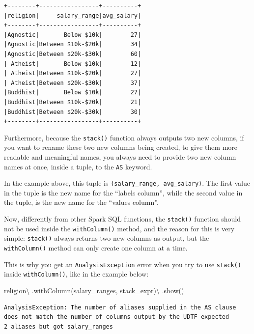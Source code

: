 \documentclass[
  11pt,
  letterpaper,
  DIV=11,
  numbers=noendperiod]{scrreprt}
\newenvironment{Shaded}{\begin{snugshade}}{\end{snugshade}}
\newcommand{\NormalTok}[1]{\textcolor[rgb]{0.00,0.23,0.31}{#1}}
\newcommand{\OperatorTok}[1]{\textcolor[rgb]{0.37,0.37,0.37}{#1}}
\newcommand{\StringTok}[1]{\textcolor[rgb]{0.13,0.47,0.30}{#1}}
\begin{document}
\begin{verbatim}
+--------+-----------------+----------+
|religion|     salary_range|avg_salary|
+--------+-----------------+----------+
|Agnostic|       Below $10k|        27|
|Agnostic|Between $10k-$20k|        34|
|Agnostic|Between $20k-$30k|        60|
| Atheist|       Below $10k|        12|
| Atheist|Between $10k-$20k|        27|
| Atheist|Between $20k-$30k|        37|
|Buddhist|       Below $10k|        27|
|Buddhist|Between $10k-$20k|        21|
|Buddhist|Between $20k-$30k|        30|
+--------+-----------------+----------+
\end{verbatim}

Furthermore, because the \texttt{stack()} function always outputs two
new columns, if you want to rename these two new columns being created,
to give them more readable and meaningful names, you always need to
provide two new column names at once, inside a tuple, to the \texttt{AS}
keyword.

In the example above, this tuple is
\texttt{(salary\_range,\ avg\_salary)}. The first value in the tuple is
the new name for the ``labels column'', while the second value in the
tuple, is the new name for the ``values column''.

Now, differently from other Spark SQL functions, the \texttt{stack()}
function should not be used inside the \texttt{withColumn()} method, and
the reason for this is very simple: \texttt{stack()} always returns two
new columns as output, but the \texttt{withColumn()} method can only
create one column at a time.

This is why you get an \texttt{AnalysisException} error when you try to
use \texttt{stack()} inside \texttt{withColumn()}, like in the example
below:

\begin{Shaded}
\begin{Highlighting}[]
\NormalTok{religion}\OperatorTok{\textbackslash{}}
\NormalTok{    .withColumn(}\StringTok{\textquotesingle{}salary\_ranges\textquotesingle{}}\NormalTok{, stack\_expr)}\OperatorTok{\textbackslash{}}
\NormalTok{    .show()}
\end{Highlighting}
\end{Shaded}

\begin{verbatim}
AnalysisException: The number of aliases supplied in the AS clause
does not match the number of columns output by the UDTF expected
2 aliases but got salary_ranges 
\end{verbatim}
\end{document}
